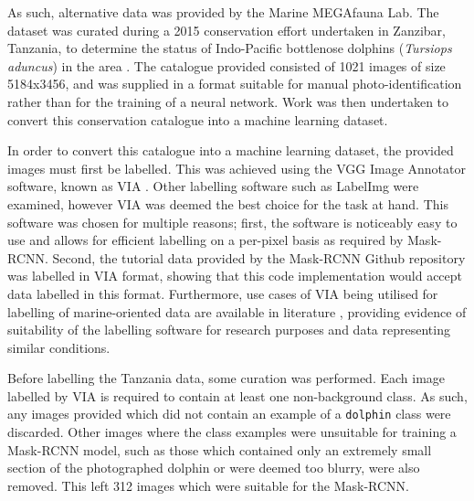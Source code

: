 As such, alternative data was provided by the Marine MEGAfauna Lab. The dataset was curated during a 2015 conservation effort undertaken in Zanzibar, Tanzania, to determine the status of Indo-Pacific bottlenose dolphins (\textit{Tursiops aduncus}) in the area \cite{sharpe_indian_2019}. The catalogue provided consisted of 1021 images of size 5184x3456, and was supplied in a format suitable for manual photo-identification rather than for the training of a neural network. Work was then undertaken to convert this conservation catalogue into a machine learning dataset. 

In order to convert this catalogue into a machine learning dataset, the provided images must first be labelled. This was achieved using the VGG Image Annotator software, known as VIA \cite{dutta_via_2019}. Other labelling software such as LabelImg \cite{tzutalin_labelimg_2021} were examined, however VIA was deemed the best choice for the task at hand. This software was chosen for multiple reasons; first, the software is noticeably easy to use and allows for efficient labelling on a per-pixel basis as required by Mask-RCNN. Second, the tutorial data provided by the Mask-RCNN Github repository was labelled in VIA format, showing that this code implementation would accept data labelled in this format. Furthermore, use cases of VIA being utilised for labelling of marine-oriented data are available in literature \cite{nita_cnn-based_2020}, providing evidence of suitability of the labelling software for research purposes and data representing similar conditions.

Before labelling the Tanzania data, some curation was performed. Each image labelled by VIA is required to contain at least one non-background class. As such, any images provided which did not contain an example of a \texttt{dolphin} class were discarded. Other images where the class examples were unsuitable for training a Mask-RCNN model, such as those which contained only an extremely small section of the photographed dolphin or were deemed too blurry, were also removed. This left 312 images which were suitable for the Mask-RCNN.

